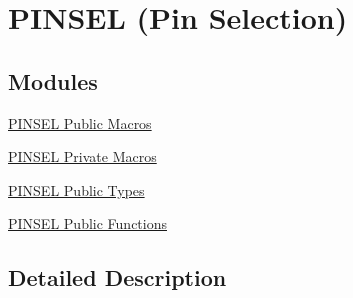 \hypertarget{group___p_i_n_s_e_l}{}\section{P\+I\+N\+S\+EL (Pin Selection)}
\label{group___p_i_n_s_e_l}
\subsection*{Modules}
\begin{DoxyCompactItemize}
\item 
\hyperlink{group___p_i_n_s_e_l___public___macros}{P\+I\+N\+S\+E\+L Public Macros}
\item 
\hyperlink{group___p_i_n_s_e_l___private___macros}{P\+I\+N\+S\+E\+L Private Macros}
\item 
\hyperlink{group___p_i_n_s_e_l___public___types}{P\+I\+N\+S\+E\+L Public Types}
\item 
\hyperlink{group___p_i_n_s_e_l___public___functions}{P\+I\+N\+S\+E\+L Public Functions}
\end{DoxyCompactItemize}


\subsection{Detailed Description}
